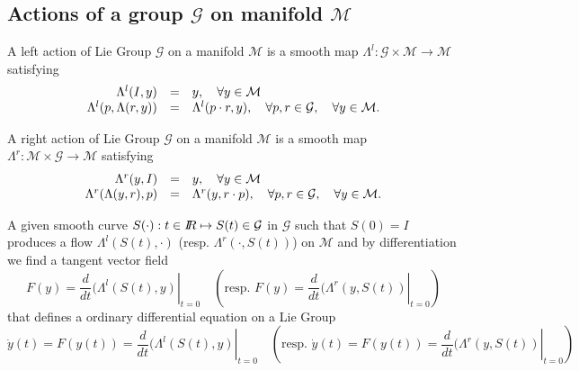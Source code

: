 \subsection{Actions of a group $\mathcal G$ on  manifold $\mathcal M$}
\begin{definition}
   A left  action of Lie Group $\mathcal G$ on a manifold $\mathcal M$ is a smooth map $\Lambda^l: \mathcal G \times  \mathcal M \rightarrow \mathcal M$ satisfying
\begin{equation}
  \label{eq:22}
  \begin{array}[lcl]{rcl}
    \Lambda^l(I,y) &=& y, \quad \forall y \in \mathcal M \\
    \Lambda^l(p,\Lambda(r,y)) &=& \Lambda^l(p\glaw r, y) , \quad \forall p,r \in \mathcal G,\quad  \forall y \in \mathcal M .
  \end{array}
\end{equation}
\end{definition}

\begin{definition}
   A  right  action of Lie Group $\mathcal G$ on a manifold $\mathcal M$ is a smooth map $\Lambda^r: \mathcal M \times \mathcal G   \rightarrow \mathcal M$ satisfying
\begin{equation}
  \label{eq:23}
  \begin{array}[lcl]{rcl}
    \Lambda^r(y,I) &=& y, \quad \forall y \in \mathcal M \\
    \Lambda^r(\Lambda(y,r), p) &=& \Lambda^r(y,  r\glaw p) , \quad \forall p,r \in \mathcal G,\quad  \forall y \in \mathcal M .
  \end{array}
\end{equation}
\end{definition}

A given smooth curve  $S(\cdot) : t\in \mbox{\rm $I\!\!R$} \mapsto S(t)\in \mathcal G$ in $\mathcal G$ such that $S(0)= I$ produces a flow $\Lambda^l(S(t),\cdot)$ (resp. $\Lambda^r(\cdot, S(t))$) on $\mathcal M$ and by differentiation we find a tangent vector field
\begin{equation}
  \label{eq:24}
  F(y) = \left. \frac{d}{dt} (\Lambda^l(S(t),y) \right|_{t=0}\quad( \text{resp.  }  F(y) = \left. \frac{d}{dt} (\Lambda^r(y,S(t)) \right|_{t=0} ) 
\end{equation}
that defines a ordinary differential equation on a Lie Group
\begin{equation}
  \label{eq:25}
  \dot y(t) = F(y(t)) = \left. \frac{d}{dt} (\Lambda^l(S(t),y) \right|_{t=0}  \quad( \text{resp.  }\dot y(t) = F(y(t)) = \left. \frac{d}{dt} (\Lambda^r(y,S(t)) \right|_{t=0})
\end{equation}
  
